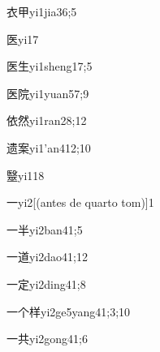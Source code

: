 \begin{verbete}{衣甲}{yi1jia3}{6;5}
\end{verbete}

\begin{verbete}{医}{yi1}{7}
\end{verbete}

\begin{verbete}{医生}{yi1sheng1}{7;5}
\end{verbete}

\begin{verbete}{医院}{yi1yuan5}{7;9}
\end{verbete}

\begin{verbete}{依然}{yi1ran2}{8;12}
\end{verbete}

\begin{verbete}{遗案}{yi1'an4}{12;10}
\end{verbete}

\begin{verbete}{毉}{yi1}{18}
\end{verbete}

\begin{verbete}{一}{yi2}[(antes de quarto tom)]{1}
\end{verbete}

\begin{verbete}{一半}{yi2ban4}{1;5}
\end{verbete}

\begin{verbete}{一道}{yi2dao4}{1;12}
\end{verbete}

\begin{verbete}{一定}{yi2ding4}{1;8}
\end{verbete}

\begin{verbete}{一个样}{yi2ge5yang4}{1;3;10}
\end{verbete}

\begin{verbete}{一共}{yi2gong4}{1;6}
\end{verbete}

